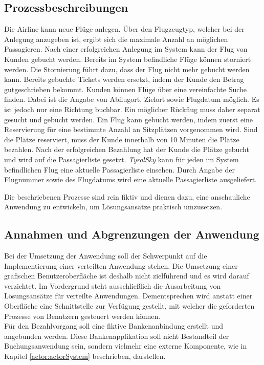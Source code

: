\subsection{Prozessbeschreibungen}
\begin{enumerate}
   Die Airline kann neue Flüge anlegen. Über den Flugzeugtyp, welcher bei der Anlegung anzugeben ist, ergibt sich die maximale Anzahl an möglichen Passagieren. Nach einer erfolgreichen Anlegung im System kann der Flug von Kunden gebucht werden.
   Bereits im System befindliche Flüge können storniert werden. Die Stornierung führt dazu, dass der Flug nicht mehr gebucht werden kann. Bereits gebuchte Tickets werden ersetzt, indem der Kunde den Betrag gutgeschrieben bekommt.
  Kunden können Flüge über eine vereinfachte Suche finden. Dabei ist die Angabe von Abflugort, Zielort sowie Flugdatum möglich. Es ist jedoch nur eine Richtung buchbar. Ein möglicher Rückflug muss daher separat gesucht und gebucht werden. 
  Ein Flug kann gebucht werden, indem zuerst eine Reservierung für eine bestimmte Anzahl an Sitzplätzen vorgenommen wird. Sind die Plätze reserviert, muss der Kunde innerhalb von 10 Minuten die Plätze bezahlen. Nach der erfolgreichen Bezahlung hat der Kunde die Plätze gebucht und wird auf die Passagierliste gesetzt. 
  \textit{TyrolSky} kann für jeden im System befindlichen Flug eine aktuelle Passagierliste einsehen. Durch Angabe der Flugnummer sowie des Flugdatums wird eine aktuelle Passagierliste ausgeliefert.
\end{enumerate}
Die beschriebenen Prozesse sind rein fiktiv und dienen dazu, eine anschauliche Anwendung zu entwickeln, um Lösungsansätze praktisch umzusetzen. 

\subsection{Annahmen und Abgrenzungen der Anwendung}
Bei der Umsetzung der Anwendung soll der Schwerpunkt auf die Implementierung einer verteilten Anwendung stehen. Die Umsetzung einer grafischen Benutzeroberfläche ist deshalb nicht zielführend und es wird darauf verzichtet. Im Vordergrund steht ausschließlich die Ausarbeitung von Lösungsansätze für verteilte Anwendungen. Dementsprechen wird anstatt einer Oberfläche eine Schnittstelle zur Verfügung gestellt, mit welcher die geforderten Prozesse von Benutzern gesteuert werden können. \\
Für den Bezahlvorgang soll eine fiktive Bankenanbindung erstellt und angebunden werden. Diese Bankenapplikation soll nicht Bestandteil der Buchungsanwendung sein, sondern vielmehr eine externe Komponente, wie in Kapitel \ref{actor:actorSystem} beschrieben, darstellen. 

